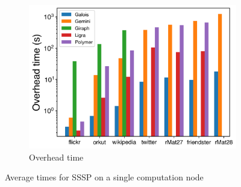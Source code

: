 \documentclass{meetings}
\begin{document}
\begin{figure}
\begin{subfigure}{0.32\textwidth}
		\includegraphics[width=\linewidth]{../../plots/singleNodeSSSP_overheadTime.png}
		\caption{Overhead time}
		\label{fig:singleNodeSSSP_overhead}
	\end{subfigure}
	\caption{Average times for SSSP on a single computation node}
	\label{fig:singleNodeSSSP}
\end{figure}%
\end{document}
